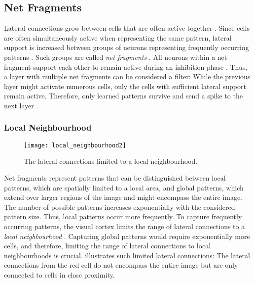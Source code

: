 \subsection{Net Fragments}
Lateral connections grow between cells that are often active together .
Since cells are often simultaneously active when representing the same pattern, lateral support is increased between groups of neurons representing frequently occurring patterns \cite{stettler_lateral_2002}. Such groups are called \emph{net fragments} .
All neurons within a net fragment support each other to remain active during an inhibition phase . 
Thus, a layer with multiple net fragments can be considered a filter: While the previous layer might activate numerous cells, only the cells with sufficient lateral support remain active. Therefore, only learned patterns survive and send a spike to the next layer \cite{von_der_malsburg_concerning_2018}.

\subsubsection{Local Neighbourhood}
\begin{figure}[h]
    \centering
    \texttt{[image: local\_neighbourhood2]}
    \caption[Lateral connections limited to a local neighbourhood]{The lateral connections limited to a local neighbourhood.}
\end{figure}
Net fragments represent patterns that can be distinguished between local patterns, which are spatially limited to a local area, and global patterns, which extend over larger regions of the image and might encompass the entire image.
The number of possible patterns increases exponentially with the considered pattern size. Thus, local patterns occur more frequently.
To capture frequently occurring patterns, the visual cortex limits the range of lateral connections to a \emph{local neighbourhood} .
Capturing global patterns would require exponentially more cells, and therefore, limiting the range of lateral connections to local neighbourhoods is crucial.
 illustrates such limited lateral connections: The lateral connections from the red cell do not encompass the entire image but are only connected to cells in close proximity.

